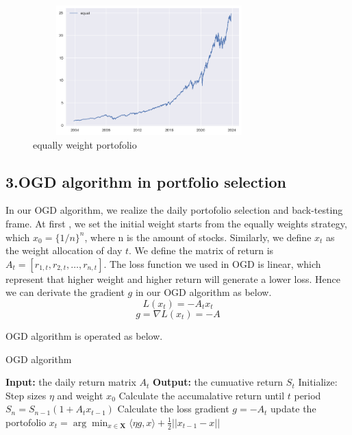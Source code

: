 \documentclass[]{report}
\begin{document}
\begin{figure}[ht]
    \centering
    \includegraphics[width=0.8\textwidth,height=5cm]{1.png}
    \caption{equally weight portofolio}
\label{fig:euqalweight}
\end{figure}

\subsection*{3.OGD algorithm in portfolio selection}

In our OGD algorithm, we realize the daily portofolio selection and back-testing frame. At first , we set the initial weight starts from the equally weights strategy, which $x_0=\{ {1/n} \} ^n$, where n is the amount of stocks. Similarly, we define $x_t$ as the weight allocation of day $t$.
We define the matrix of return is $A_t=[r_{1,t},r_{2,t},\ldots,r_{n,t}]$. The loss function we used in OGD is linear, which represent that higher weight and higher return will generate a lower loss. Hence we can derivate the gradient $g$ in our OGD algorithm as below.
$$
L(x_t)=-A_tx_t
$$
$$
g=\nabla L(x_t)=-A
$$

OGD algorithm is operated as below.
\begin{algorithm}
    \caption[]{OGD algorithm}
    \begin{algorithmic}[1]
        \Statex \textbf{Input:} the daily return matrix $A_t$
        \Statex\textbf{Output:} the cumuative return $S_t$
        \State Initialize: Step sizes $\eta$ and weight $x_0$
        \State Calculate the accumalative return until $t$ period $S_n=S_{n-1}(1+A_tx_{t-1})$
        \State Calculate the loss gradient $g=-A_t$
        \State update the portofolio $x_t= \arg \min_{x\in \textbf{X}}\langle\eta g,x \rangle+\frac{1}{2}||x_{t-1}-x||$
        \EndFor
        
    \end{algorithmic}
\end{algorithm} 
\end{document}
